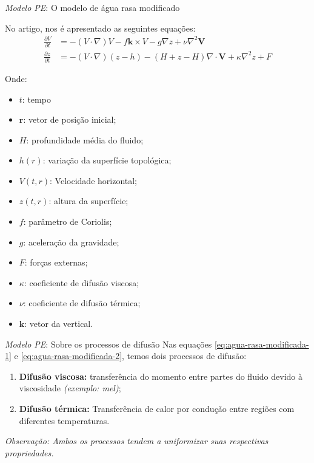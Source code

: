 \begin{frame}{\textit{Modelo PE}: O modelo de água rasa modificado}
	\begin{small}
		No artigo, nos é apresentado as seguintes equações:
		\begin{align}
			\frac{\partial V}{\partial t} & = - ( V \cdot \nabla)V - f \mathbf{k} \times V - g \nabla z + \nu \nabla^2\mathbf{V} \label{eq:agua-rasa-modificada-1}     \\
			\frac{\partial z}{\partial t} & = - (V \cdot \nabla)(z - h) - (H + z - H)\nabla \cdot \mathbf{V} + \kappa \nabla^2 z + F \label{eq:agua-rasa-modificada-2} 
		\end{align}
	\end{small}
	\begin{scriptsize}
		Onde:
		\begin{multicols}{2}
			\begin{itemize}
				\item $t$: tempo
				\item $\mathbf{r}$: vetor de posição inicial;
				\item $H$: profundidade média do fluido;
				\item $h(r)$: variação da superfície topológica;
				\item $V(t,r)$: Velocidade horizontal;
				\item $z(t,r)$: altura da superfície;
				\item $f$: parâmetro de Coriolis;
				\item $g$: aceleração da gravidade;
				\item $F$: forças externas;
				\item $\kappa$: coeficiente de difusão viscosa;
				\item $\nu$: coeficiente de difusão térmica;
				\item $\mathbf{k}$: vetor da vertical.
			\end{itemize}
		\end{multicols}
	\end{scriptsize}
\end{frame}


\begin{frame}{\textit{Modelo PE}: Sobre os processos de difusão}
	Nas equações \eqref{eq:agua-rasa-modificada-1} e \eqref{eq:agua-rasa-modificada-2}, temos dois processos de difusão:
	\begin{enumerate}
		\item \textbf{Difusão viscosa:} transferência do momento entre partes do fluido devido à viscosidade \textit{(exemplo: mel)};
		\item \textbf{Difusão térmica:} Transferência de calor por condução entre regiões com diferentes temperaturas.
	\end{enumerate}
		
	\begin{small}
	    \textit{Observação: Ambos os processos tendem a uniformizar suas respectivas propriedades.}
	\end{small}
\end{frame}


